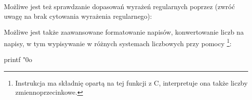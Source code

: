 
Możliwe jest też sprawdzanie dopasowań wyrażeń regularnych poprzez (zwróć uwagę na brak cytowania wyrażenia regularnego):


Możliwe jest także zaawansowane formatowanie napisów, konwertowanie liczb na napisy,
w tym wypisywanie w różnych systemach liczbowych przy pomocy \Verb@printf@\footnote{
	Instrukcja \Verb@printf@ ma składnię opartą na tej funkcji z C, interpretuje ona także liczby zmiennoprzecinkowe.
}:

\begin{CodeFrame*}[bash]{}
printf "0o%
\end{CodeFrame*}
